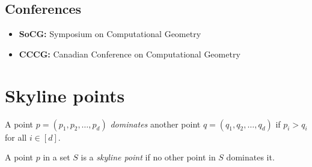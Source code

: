 \section*{Conferences} \label{sec:conferences}
\begin{itemize}
    \item \textbf{SoCG:} Symposium on Computational Geometry
    \item \textbf{CCCG:} Canadian Conference on Computational Geometry
\end{itemize}

\chapter{Skyline points} \label{chp:skyline}

\begin{definition*} \label{def:skyline}
    A point $p = (p_1, p_2, \dots, p_d)$ \emph{dominates}
    another point $q = (q_1, q_2, \dots, q_d)$ if
    $p_i > q_i$ for all $i \in [d]$.

    A point $p$ in a set $S$ is a \emph{skyline point} if no other point in
    $S$ dominates it.
\end{definition*}

